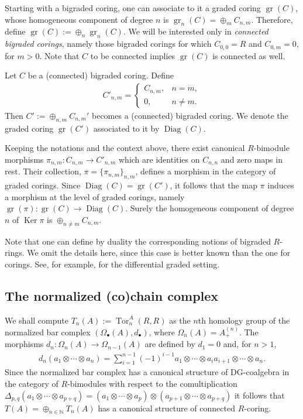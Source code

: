 \documentclass[pdftex]{sigma}
\DeclareMathOperator{\Tor}{Tor}
\newcommand\ot{\otimes}
\newcommand\op{\oplus}
\newcommand{\Ap}[1]{A_+^{(#1)}}
\renewcommand{\^}[1]{\mbox{$^{\left( #1 \right)}$}}
\renewcommand{\_}[1]{\mbox{$_{\left( #1 \right)}$}}
\numberwithin{equation}{section}
\begin{document}
Starting with a bigraded coring, one can associate to it a graded coring $\operatorname{gr}(C)$, whose homogeneous component of degree $n$ is $\operatorname{gr}_n(C)=\oplus_m C_{n,m}$. Therefore, def\/ine $\operatorname{gr}(C):=\oplus_n \operatorname{gr}_n(C)$. We will be interested only in \textit{connected bigraded corings}, namely those bigraded corings for which $C_{0,0}=R$ and $C_{0,m}=0$, for $m>0$. Note that $C$ to be connected implies $\operatorname{gr}(C)$ is connected as well.

Let $C$ be a (connected) bigraded coring. Def\/ine
\begin{gather*} C'_{n,m}=\begin{cases} C_{n,m}, & n=m, \\ 0, & n\neq m.\end{cases}\end{gather*}
Then ${C'}:=\oplus_{n,m} {C}_{n,m}'$ becomes a (connected) bigraded coring. We denote the graded coring $\operatorname{gr}({C'})$ associated to it by $\operatorname{Diag}(C)$.

Keeping the notations and the context above, there exist canonical $R$-bimodule morphisms $\pi_{n,m} \colon C_{n,m} \to C'_{n,m}$ which are identities on $C_{n,n}$ and zero maps in rest. Their collection, $\pi = \{\pi_{n,m}\}_{n,m}$, def\/ines a morphism in the category of graded corings. Since $\operatorname{Diag}(C) = \operatorname{gr}(C')$, it follows that the map $\pi$ induces a morphism at the level of graded corings, namely $\operatorname{gr}(\pi) \colon \operatorname{gr}(C) \to \operatorname{Diag}(C)$. Surely the homogeneous component of degree $n$ of $\operatorname{Ker}\pi$ is $\op_{n \neq m} C_{n,m}$.

Note that one can def\/ine by duality the corresponding notions of bigraded $R$-rings. We omit the details here, since this case is better known than the one for corings. See, for example, \cite{pi} for the dif\/ferential graded setting.

\subsection{The normalized (co)chain complex} \label{sec-t(a)}
We shall compute $T_n(A):=\Tor_n^A(R,R)$ as the $n$th homology group of the normalized bar complex $(\Omega_\bullet(A), d_\bullet)$, where $\Omega_n(A)=\Ap{n}$. The morphisms $d_n\colon \Omega_n(A)\to\Omega_{n-1}(A)$ are def\/ined by $d_1=0$ and, for $n>1$,
\begin{gather*}
d_n(a_1\ot\cdots \ot a_n)=\sum_{i=1}^{n-1}(-1)^{i-1}a_1\ot\cdots \ot a_ia_{i+1}\ot\cdots\ot a_n.
\end{gather*}
Since the normalized bar complex has a canonical structure of DG-coalgebra in the category of $R$-bimodules with respect to the comultiplication $\Delta_{p,q}(a_1\ot\cdots \ot a_{p+q})=(a_1\ot\cdots \ot a_{p})\ot(a_{p+1}\ot\cdots \ot a_{p+q})$ it follows that $T(A)=\oplus_{n \in \mathbb{N}} T_n(A)$ has a canonical structure of connected $R$-coring.
	
\end{document}
